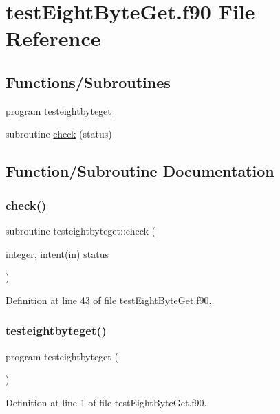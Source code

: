 \hypertarget{testEightByteGet_8f90}{}\section{test\+Eight\+Byte\+Get.\+f90 File Reference}
\label{testEightByteGet_8f90}
\subsection*{Functions/\+Subroutines}
\begin{DoxyCompactItemize}
\item 
program \hyperlink{testEightByteGet_8f90_ac57cf7c3bc762813ca3249d98da33f23}{testeightbyteget}
\item 
subroutine \hyperlink{testEightByteGet_8f90_acf02e33ff67cf06e34dc8e482ab70fb2}{check} (status)
\end{DoxyCompactItemize}


\subsection{Function/\+Subroutine Documentation}
\mbox{\label{testEightByteGet_8f90_acf02e33ff67cf06e34dc8e482ab70fb2}} 
\subsubsection{\texorpdfstring{check()}{check()}}
{\footnotesize\ttfamily subroutine testeightbyteget\+::check (\begin{DoxyParamCaption}\item[{integer, intent(in)}]{status }\end{DoxyParamCaption})}



Definition at line 43 of file test\+Eight\+Byte\+Get.\+f90.

\mbox{\label{testEightByteGet_8f90_ac57cf7c3bc762813ca3249d98da33f23}} 
\subsubsection{\texorpdfstring{testeightbyteget()}{testeightbyteget()}}
{\footnotesize\ttfamily program testeightbyteget (\begin{DoxyParamCaption}{ }\end{DoxyParamCaption})}



Definition at line 1 of file test\+Eight\+Byte\+Get.\+f90.

